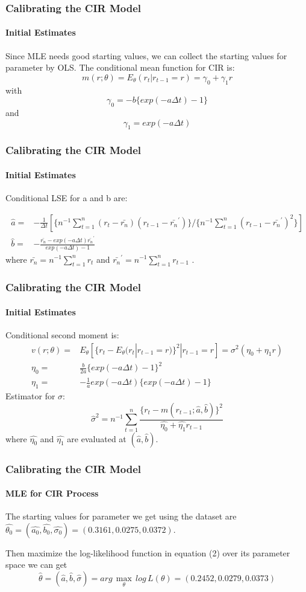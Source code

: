 \documentclass[11pt]{beamer}
\begin{document}
	
	\begin{frame}
		\frametitle{Calibrating the CIR Model}
		\framesubtitle{Initial Estimates}
		Since MLE needs good starting values, we can collect the starting values for parameter by OLS.
		The conditional mean function for CIR is:
		\[
		m(r;\theta)=E_\theta (r_t|r_{t-1}=r)=\gamma_0+\gamma_1r
		\]
		with
		\[
		\gamma_0=-b\{exp(-a\Delta t)-1\}
		\]
		and
		\[
		\gamma_1=exp(-a\Delta t)
		\]
	\end{frame}
	
	
	\begin{frame}
		\frametitle{Calibrating the CIR Model}
		\framesubtitle{Initial Estimates}
		Conditional LSE for a and b are:
		
		\begin{align*}
		\hat{a}=& -\frac{1}{\Delta t}[\{n^{-1}\sum_{t=1}^{n}(r_t-\bar{r_n})(r_{t-1}-\bar{r_{n}}^{'})\}/\{n^{-1}\sum_{t=1}^{n}(r_{t-1}-\bar{r_{n}}^{'})^2\}] \\
		\hat{b}=& -\frac{\bar{r_n}-exp(-a\Delta t)\bar{r_{n}}^{'}}{exp(-a\Delta t)-1}
		\end{align*}
		where $ \bar{r_n}=n^{-1}\sum_{t=1}^{n}r_t $ and $\bar{r_{n}}^{'}=n^{-1}\sum_{t=1}^{n}r_{t-1} $ .
	\end{frame}
	
	
	\begin{frame}
		\frametitle{Calibrating the CIR Model}
		\framesubtitle{Initial Estimates}
		Conditional second moment is:
		\begin{align*}
		v(r;\theta)=& E_\theta [\{r_t-E_\theta(r_t|r_{t-1}=r)\}^2|r_{t-1}=r]=\sigma^2(\eta_0+\eta_1r) \\
		\eta_0=& \frac{b}{2a}\{exp(-a\Delta t)-1\}^2 \\
		\eta_1=& -\frac{1}{a}exp(-a\Delta t)\{exp(-a\Delta t)-1\}
		\end{align*}
		Estimator for $ \sigma $:
		\[
		\hat{\sigma}^2=n^{-1}\sum_{t=1}^{n}\frac{\{r_t-m(r_{t-1};\hat{a},\hat{b})\}^2}{\hat{\eta_0}+\hat{\eta_1}r_{t-1}}
		\]
		where $ \hat{\eta_0} $ and $ \hat{\eta_1} $ are evaluated at $ (\hat{a},\hat{b}) $.
	\end{frame}
	
	
	\begin{frame}
		\frametitle{Calibrating the CIR Model}
		\framesubtitle{MLE for CIR Process}
		The starting values for parameter we get using the dataset are $ \hat{\theta_0}=(\hat{a_0}, \hat{b_0}, \hat{\sigma_0})=(0.3161, 0.0275, 0.0372) $.
		\newline
		
		Then maximize the log-likelihood function in equation (2) over its parameter space we can get
		\[
		\hat{\theta}=(\hat{a}, \hat{b}, \hat{\sigma})=arg\, \max \limits_\theta \,log \,L(\theta)=(0.2452, 0.0279, 0.0373)
		\]
	\end{frame}
	
\end{document}
